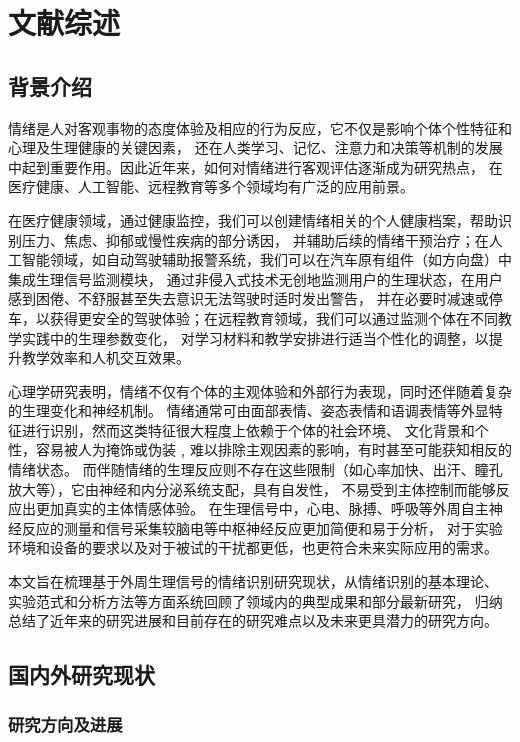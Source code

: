 \cleardoublepage
\chapter{文献综述}

\section{背景介绍}
情绪是人对客观事物的态度体验及相应的行为反应，它不仅是影响个体个性特征和心理及生理健康的关键因素，
还在人类学习、记忆、注意力和决策等机制的发展中起到重要作用。因此近年来，如何对情绪进行客观评估逐渐成为研究热点，
在医疗健康、人工智能、远程教育等多个领域均有广泛的应用前景。

在医疗健康领域，通过健康监控，我们可以创建情绪相关的个人健康档案，帮助识别压力、焦虑、抑郁或慢性疾病的部分诱因，
并辅助后续的情绪干预治疗；在人工智能领域，如自动驾驶辅助报警系统，我们可以在汽车原有组件（如方向盘）中集成生理信号监测模块，
通过非侵入式技术无创地监测用户的生理状态，在用户感到困倦、不舒服甚至失去意识无法驾驶时适时发出警告，
并在必要时减速或停车，以获得更安全的驾驶体验\cite{Placido2012}；在远程教育领域，我们可以通过监测个体在不同教学实践中的生理参数变化，
对学习材料和教学安排进行适当个性化的调整，以提升教学效率和人机交互效果。

心理学研究表明，情绪不仅有个体的主观体验和外部行为表现，同时还伴随着复杂的生理变化和神经机制。
情绪通常可由面部表情、姿态表情和语调表情等外显特征进行识别，然而这类特征很大程度上依赖于个体的社会环境、
文化背景和个性，容易被人为掩饰或伪装﹐难以排除主观因素的影响，有时甚至可能获知相反的情绪状态。
而伴随情绪的生理反应则不存在这些限制（如心率加快、出汗、瞳孔放大等），它由神经和内分泌系统支配，具有自发性，
不易受到主体控制而能够反应出更加真实的主体情感体验。
在生理信号中，心电、脉搏、呼吸等外周自主神经反应的测量和信号采集较脑电等中枢神经反应更加简便和易于分析，
对于实验环境和设备的要求以及对于被试的干扰都更低，也更符合未来实际应用的需求。

本文旨在梳理基于外周生理信号的情绪识别研究现状，从情绪识别的基本理论、
实验范式和分析方法等方面系统回顾了领域内的典型成果和部分最新研究，
归纳总结了近年来的研究进展和目前存在的研究难点以及未来更具潜力的研究方向。


\section{国内外研究现状}

\subsection{研究方向及进展}

